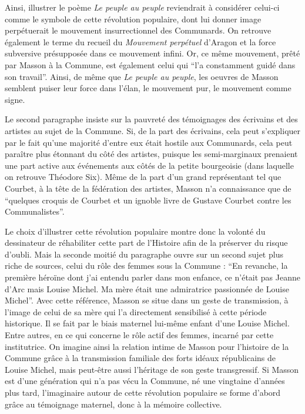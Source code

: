 	  Ainsi, illustrer le poème \emph{Le peuple au peuple} reviendrait à considérer celui-ci comme le symbole de cette révolution populaire, dont lui donner image perpétuerait le mouvement insurrectionnel des Communards. On retrouve également le terme du recueil du \emph{Mouvement perpétuel} d’Aragon et la force subversive présupposée dans ce mouvement infini. Or, ce même mouvement, prêté par Masson à la Commune, est également celui qui \enquote{l’a constamment guidé dans son travail}. Ainsi, de même que \emph{Le peuple au peuple}, les oeuvres de Masson semblent puiser leur force dans l’élan, le mouvement pur, le mouvement comme signe. 

	Le second paragraphe insiste sur la pauvreté des témoignages des écrivains et des artistes au sujet de la Commune. Si, de la part des écrivains, cela peut s’expliquer par le fait qu’une majorité d’entre eux était hostile aux Communards, cela peut paraître plus étonnant du côté des artistes, puisque les semi-marginaux prenaient une part active aux événements aux côtés de la petite bourgeoisie (dans laquelle on retrouve Théodore Six). Même de la part d’un grand représentant tel que Courbet, à la tête de la fédération des artistes, Masson n’a connaissance que de \enquote{quelques croquis de Courbet et un ignoble livre de Gustave Courbet contre les Communalistes}. 

    Le choix d’illustrer cette révolution populaire montre donc la volonté du dessinateur de réhabiliter cette part de l’Histoire afin de la préserver du risque d’oubli. Mais la seconde moitié du paragraphe ouvre sur un second sujet plus riche de sources, celui du rôle des femmes sous la Commune : \enquote{En revanche, la première héroïne dont j’ai entendu parler dans mon enfance, ce n’était pas Jeanne d’Arc mais Louise Michel. Ma mère était une admiratrice passionnée de Louise Michel}. Avec cette référence, Masson se situe dans un geste de transmission, à l’image de celui de sa mère qui l’a directement sensibilisé à cette période historique. Il se fait par le biais maternel lui-même enfant d’une Louise Michel. Entre autres, en ce qui concerne le rôle actif des femmes, incarné par cette institutrice. On imagine ainsi la relation intime de Masson pour l’histoire de la Commune grâce à la transmission familiale des forts idéaux républicains de Louise Michel, mais peut-être aussi l’héritage de son geste transgressif. Si Masson est d’une génération qui n’a pas vécu la Commune, né une vingtaine d’années plus tard, l’imaginaire autour de cette révolution populaire se forme d’abord grâce au témoignage maternel, donc à la mémoire collective. 

